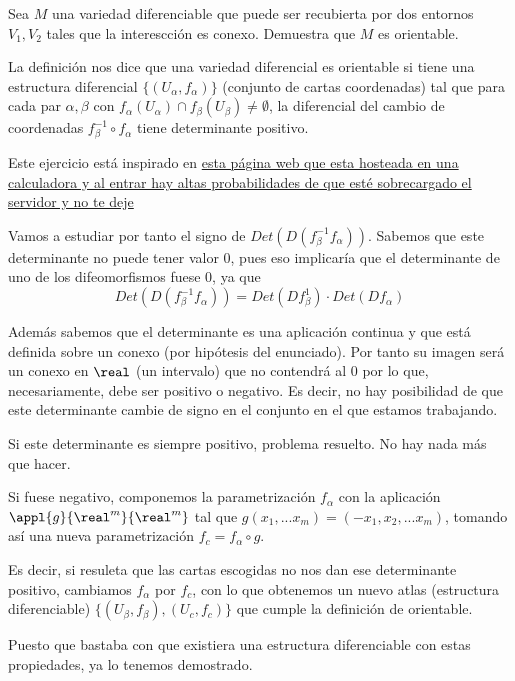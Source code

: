 \begin{problem}[8]
Sea $M$ una variedad diferenciable que puede ser recubierta por dos entornos $V_1, V_2$ tales que la interescción es conexo. Demuestra que $M$ es orientable.

\solution


La definición nos dice que una variedad diferencial es orientable si tiene una estructura diferencial $\{(U_α, f_α)\}$ (conjunto de cartas coordenadas) tal que para cada par $α,β$ con $f_α(U_α)\cap f_β(U_β)\neq \emptyset$, la diferencial del cambio de coordenadas $f^{-1}_β \circ f_α$ tiene determinante positivo.

Este ejercicio está inspirado en \href{http://rinconmatematico.com/foros/index.php?action=printpage;topic=22474.0}{esta página web que esta hosteada en una calculadora y al entrar hay altas probabilidades de que esté sobrecargado el servidor y no te deje}

Vamos a estudiar por tanto el signo de $Det(D(f_β^{-1}f_α))$. Sabemos que este determinante no puede tener valor 0, pues eso implicaría que el determinante de uno de los difeomorfismos fuese 0, ya que
\[Det(D(f_β^{-1}f_α)) = Det(Df_β^{1})\cdot Det(Df_α)\]

Además sabemos que el determinante es una aplicación continua y que está definida sobre un conexo (por hipótesis del enunciado). Por tanto su imagen será un conexo en $\real$ (un intervalo) que no contendrá al 0 por lo que, necesariamente, debe ser positivo o negativo. Es decir, no hay posibilidad de que este determinante cambie de signo en el conjunto en el que estamos trabajando.

Si este determinante es siempre positivo, problema resuelto. No hay nada más que hacer.

Si fuese negativo, componemos la parametrización $f_α$ con la aplicación $\appl{g}{\real^m}{\real^m}$ tal que $g(x_1,...x_m)=(-x_1,x_2,...x_m)$, tomando así una nueva parametrización $f_c = f_α \circ g$.

Es decir, si resuleta que las cartas escogidas no nos dan ese determinante positivo, cambiamos $f_α$ por $f_c$, con lo que obtenemos un nuevo atlas (estructura diferenciable) $\{(U_β,f_β),(U_c, f_c)\}$ que cumple la definición de orientable.

Puesto que bastaba con que existiera una estructura diferenciable con estas propiedades, ya lo tenemos demostrado.
\end{problem}

